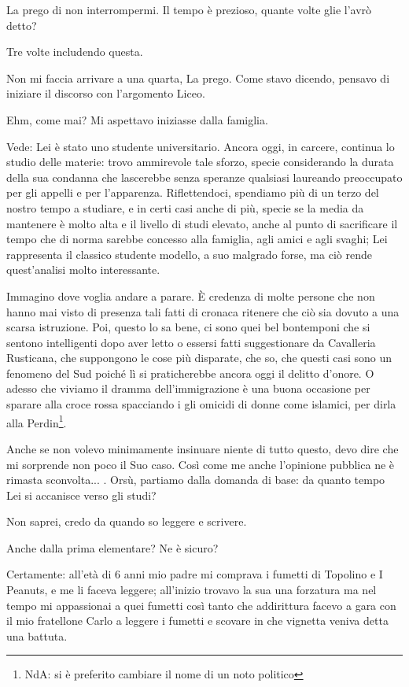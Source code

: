 \documentclass[a4paper,12pt]{article}
\newcommand{\Walter}{\speak{W}}
\newcommand{\Pollazzi}{\speak{P}}
\begin{document}
\begin{dialogue}
\Pollazzi La prego di non interrompermi. Il tempo è prezioso, quante volte glie l'avrò detto?

\Walter Tre volte includendo questa.

\Pollazzi Non mi faccia arrivare a una quarta, La prego. Come stavo dicendo, pensavo di iniziare il discorso con l'argomento Liceo.

\Walter Ehm, come mai? Mi aspettavo iniziasse dalla famiglia.

\Pollazzi Vede: Lei è stato uno studente universitario. Ancora oggi, in carcere, continua lo studio delle materie: trovo ammirevole tale sforzo, specie considerando la durata della sua condanna che lascerebbe senza speranze qualsiasi laureando preoccupato per gli appelli e per l'apparenza. Riflettendoci, spendiamo più di un terzo del nostro tempo a studiare, e in certi casi anche di più, specie se la media da mantenere è molto alta e il livello di studi elevato, anche al punto di sacrificare il tempo che di norma sarebbe concesso alla famiglia, agli amici e agli svaghi; Lei rappresenta il classico studente modello, a suo malgrado forse, ma ciò rende quest'analisi molto interessante.

\Walter Immagino dove voglia andare a parare. È credenza di molte persone che non hanno mai visto di presenza tali fatti di cronaca ritenere che ciò sia dovuto a una scarsa istruzione. Poi, questo lo sa bene, ci sono quei bel bontemponi che si sentono intelligenti dopo aver letto o essersi fatti suggestionare da Cavalleria Rusticana, che suppongono le cose più disparate, che so, che questi casi sono un fenomeno del Sud poiché lì si praticherebbe ancora oggi il delitto d'onore. O adesso che viviamo il dramma dell'immigrazione è una buona occasione per sparare alla croce rossa spacciando i gli omicidi di donne come islamici, per dirla alla Perdin\footnote{NdA: si è preferito cambiare il nome di un noto politico}.

\Pollazzi Anche se non volevo minimamente insinuare niente di tutto questo, devo dire che mi sorprende non poco il Suo caso. Così come me anche l'opinione pubblica ne è rimasta sconvolta... . Orsù, partiamo dalla domanda di base: da quanto tempo Lei si accanisce verso gli studi?

\Walter Non saprei, credo da quando so leggere e scrivere.

\Pollazzi Anche dalla prima elementare? Ne è sicuro?

\Walter Certamente: all'età di 6 anni mio padre mi comprava i fumetti di Topolino e I Peanuts, e me li faceva leggere; all'inizio trovavo la sua una forzatura ma nel tempo mi appassionai a quei fumetti così tanto che addirittura facevo a gara con il mio fratellone Carlo a leggere i fumetti e scovare in che vignetta veniva detta una battuta.


\end{dialogue}
\end{document}
